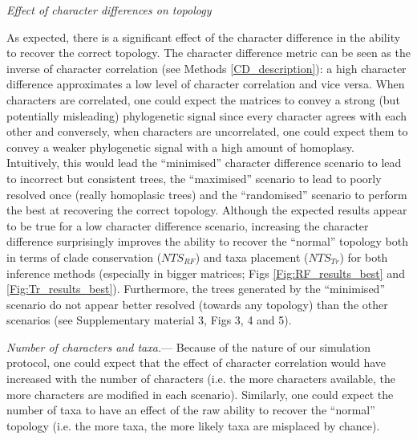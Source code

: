\documentclass[12pt,letterpaper]{article}
\renewcommand{\subsection}[1]{%
\bigskip
\begin{center}
\begin{large}
\normalfont\itshape #1
\end{large}
\end{center}}
\renewcommand{\subsubsection}[1]{%
\vspace{2ex}
\noindent
\textit{#1.}---}
\begin{document}
\subsection{Effect of character differences on topology}
As expected, there is a significant effect of the character difference in the ability to recover the correct topology.
The character difference metric can be seen as the inverse of character correlation (see Methods \ref{CD_description}): a high character difference approximates a low level of character correlation and vice versa.
When characters are correlated, one could expect the matrices to convey a strong (but potentially misleading) phylogenetic signal since every character agrees with each other and conversely, when characters are uncorrelated, one could expect them to convey a weaker phylogenetic signal with a high amount of homoplasy.
Intuitively, this would lead the ``minimised'' character difference scenario to lead to incorrect but consistent trees, the ``maximised'' scenario to lead to poorly resolved once (really homoplasic trees) and the ``randomised'' scenario to perform the best at recovering the correct topology.
Although the expected results appear to be true for a low character difference scenario, increasing the character difference surprisingly improves the ability to recover the ``normal'' topology both in terms of clade conservation ($NTS_{RF}$) and taxa placement ($NTS_{Tr}$) for both inference methods (especially in bigger matrices; Figs \ref{Fig:RF_results_best} and \ref{Fig:Tr_results_best}).
Furthermore, the trees generated by the ``minimised'' scenario do not appear better resolved (towards any topology) than the other scenarios (see Supplementary material 3, Figs 3, 4 and 5).

\subsubsection{Number of characters and taxa}
Because of the nature of our simulation protocol, one could expect that the effect of character correlation would have increased with the number of characters (i.e. the more characters available, the more characters are modified in each scenario).
Similarly, one could expect the number of taxa to have an effect of the raw ability to recover the ``normal'' topology (i.e. the more taxa, the more likely taxa are misplaced by chance).
\end{document}
